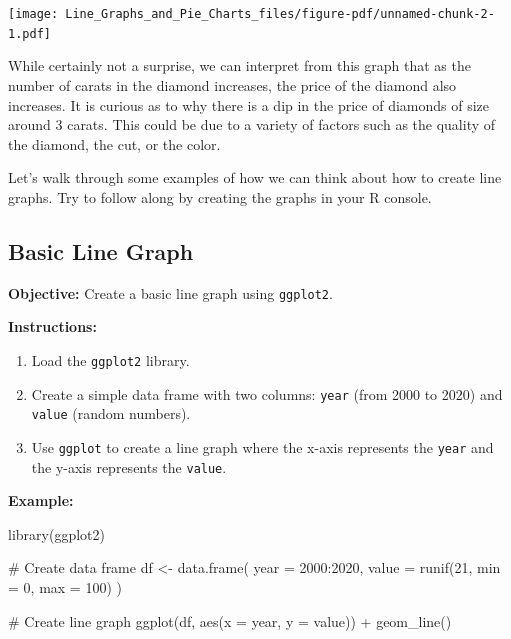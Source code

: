 \documentclass[
  letterpaper,
  DIV=11,
  numbers=noendperiod]{scrreprt}
\newenvironment{Shaded}{\begin{snugshade}}{\end{snugshade}}
\newcommand{\AttributeTok}[1]{\textcolor[rgb]{0.40,0.45,0.13}{#1}}
\newcommand{\CommentTok}[1]{\textcolor[rgb]{0.37,0.37,0.37}{#1}}
\newcommand{\DecValTok}[1]{\textcolor[rgb]{0.68,0.00,0.00}{#1}}
\newcommand{\FunctionTok}[1]{\textcolor[rgb]{0.28,0.35,0.67}{#1}}
\newcommand{\NormalTok}[1]{\textcolor[rgb]{0.00,0.23,0.31}{#1}}
\newcommand{\OtherTok}[1]{\textcolor[rgb]{0.00,0.23,0.31}{#1}}
\newcommand{\SpecialCharTok}[1]{\textcolor[rgb]{0.37,0.37,0.37}{#1}}
\providecommand{\tightlist}{%
  \setlength{\itemsep}{0pt}\setlength{\parskip}{0pt}}\usepackage{longtable,booktabs,array}
\begin{document}
\texttt{[image: Line\_Graphs\_and\_Pie\_Charts\_files/figure-pdf/unnamed-chunk-2-1.pdf]}

While certainly not a surprise, we can interpret from this graph that as
the number of carats in the diamond increases, the price of the diamond
also increases. It is curious as to why there is a dip in the price of
diamonds of size around 3 carats. This could be due to a variety of
factors such as the quality of the diamond, the cut, or the color.

Let's walk through some examples of how we can think about how to create
line graphs. Try to follow along by creating the graphs in your R
console.

\subsection*{Basic Line Graph}\label{basic-line-graph}

\textbf{Objective:} Create a basic line graph using \texttt{ggplot2}.

\textbf{Instructions:}

\begin{enumerate}
\def\labelenumi{\arabic{enumi}.}
\tightlist
\item
  Load the \texttt{ggplot2} library.
\item
  Create a simple data frame with two columns: \texttt{year} (from 2000
  to 2020) and \texttt{value} (random numbers).
\item
  Use \texttt{ggplot} to create a line graph where the x-axis represents
  the \texttt{year} and the y-axis represents the \texttt{value}.
\end{enumerate}

\textbf{Example:}

\begin{Shaded}
\begin{Highlighting}[]
\FunctionTok{library}\NormalTok{(ggplot2)}

\CommentTok{\# Create data frame}
\NormalTok{df }\OtherTok{\textless{}{-}} \FunctionTok{data.frame}\NormalTok{(}
  \AttributeTok{year =} \DecValTok{2000}\SpecialCharTok{:}\DecValTok{2020}\NormalTok{,}
  \AttributeTok{value =} \FunctionTok{runif}\NormalTok{(}\DecValTok{21}\NormalTok{, }\AttributeTok{min =} \DecValTok{0}\NormalTok{, }\AttributeTok{max =} \DecValTok{100}\NormalTok{)}
\NormalTok{)}

\CommentTok{\# Create line graph}
\FunctionTok{ggplot}\NormalTok{(df, }\FunctionTok{aes}\NormalTok{(}\AttributeTok{x =}\NormalTok{ year, }\AttributeTok{y =}\NormalTok{ value)) }\SpecialCharTok{+}
  \FunctionTok{geom\_line}\NormalTok{()}
\end{Highlighting}
\end{Shaded}
\end{document}

